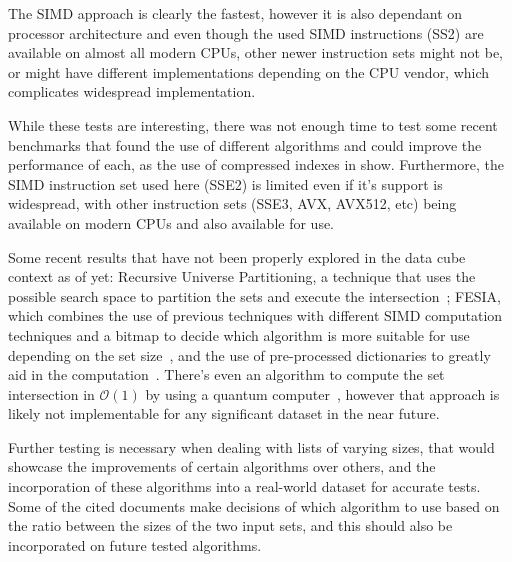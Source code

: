 The SIMD approach is clearly the fastest, however it is also dependant on processor architecture and even though the used SIMD instructions (SS2) are available on almost all modern CPUs, other newer instruction sets might not be, or might have different implementations depending on the CPU vendor, which complicates widespread implementation.

While these tests are interesting, there was not enough time to test some recent benchmarks that found the use of different algorithms and could improve the performance of each, as the use of compressed indexes in \cite{pibiriTechniquesInvertedIndex2019} show.
Furthermore, the SIMD instruction set used here (SSE2) is limited even if it's support is widespread, with other instruction sets (SSE3, AVX, AVX512, etc) being available on modern CPUs and also available for use.

Some recent results that have not been properly explored in the data cube context as of yet: Recursive Universe Partitioning, a technique that uses the possible search space to partition the sets and execute the intersection~\cite{pibiriFastCompactSet2021}; FESIA, which combines the use of previous techniques with different SIMD computation techniques and a bitmap to decide which algorithm is more suitable for use depending on the set size~\cite{zhangFESIAFastSIMDEfficient2020}, and the use of pre-processed dictionaries to greatly aid in the computation~\cite{dingFastSetIntersection2011a}.
There's even an algorithm to compute the set intersection in $\mathcal{O}(1)$ by using a quantum computer~\cite{tianQuantumAlgorithmFinding2019}, however that approach is likely not implementable for any significant dataset in the near future.

Further testing is necessary when dealing with lists of varying sizes, that would showcase the improvements of certain algorithms over others, and the incorporation of these algorithms into a real-world dataset for accurate tests.
Some of the cited documents make decisions of which algorithm to use based on the ratio between the sizes of the two input sets, and this should also be incorporated on future tested algorithms.

